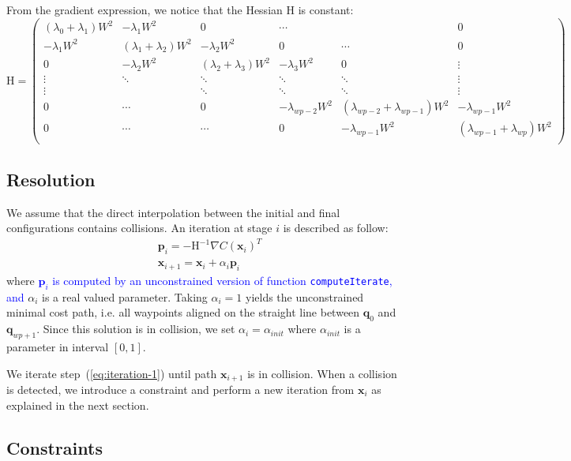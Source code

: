 \documentclass{tADR2e}
\newcommand\p{\mathbf{p}}
\newcommand\conf{\mathbf{q}}
\newcommand\xx{\mathbf{x}} %
\newcommand\cost{C}
\newcommand\weight{W}
\begin{document}
From the gradient expression, we notice that the Hessian $\mbox{H}$ is constant:
$$
\mbox{H} = \left(\begin{array}{cccccc}
(\lambda_{0}+\lambda_{1})\weight^2 & -\lambda_{1}\weight^2 & 0 & \cdots & & 0 \\
-\lambda_{1}\weight^2 & (\lambda_{1}+\lambda_{2})\weight^2 & -\lambda_{2}\weight^2 & 0 & \cdots & 0 \\
0 & -\lambda_{2}\weight^2 &  (\lambda_{2}+\lambda_{3})\weight^2 & -\lambda_{3}\weight^2 & 0 & \vdots \\
\vdots & \ddots & \ddots & \ddots & \ddots & \vdots\\
\vdots & & \ddots & \ddots & \ddots & \vdots\\
0 & \cdots  & 0 & -\lambda_{wp-2}\weight^2 & (\lambda_{wp-2}+\lambda_{wp-1})\weight^2 & -\lambda_{wp-1}\weight^2 \\
0 & \cdots &  \cdots & 0 & -\lambda_{wp-1}\weight^2 & (\lambda_{wp-1}+\lambda_{wp})\weight^2  \\
\end{array}\right)
$$

\subsection {Resolution}
We assume that the direct interpolation between the initial and final configurations contains collisions. An iteration at stage $i$ is described as follow:
\begin{equation}\label{eq:iteration-1}
\begin{split}
& \p_i =  -\mbox{H}^{-1} \nabla \cost(\xx_i)^{T} \\
& \xx_{i+1} =  \xx_{i} + \alpha_i \p_i
\end{split} 
\end{equation}
where \textcolor{blue}{$\p_i$ is computed by an unconstrained version of function \texttt{computeIterate}, and} $\alpha_i$ is a real valued parameter. Taking $\alpha_i=1$ yields the 
unconstrained minimal cost path, i.e. all waypoints aligned on the straight line 
between $\conf_0$ and $\conf_{wp+1}$. Since this solution is in collision, we set 
$\alpha_i = \alpha_{init}$
where $\alpha_{init}$ is a parameter in interval $[0,1]$.

We iterate step~(\ref{eq:iteration-1}) until path $\xx_{i+1}$ is in collision.
When a collision is detected, we introduce a constraint and perform a new 
iteration from $\xx_i$ as explained in the next section.

\subsection{Constraints}
\end{document}
